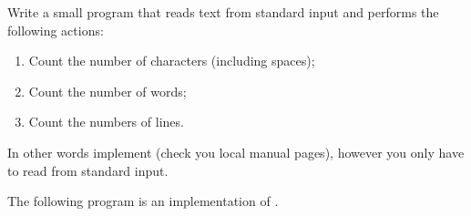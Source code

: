 \begin{Exercise}[title={Word and letter count},difficulty=5]
\label{ex:wc}
\Question\label{ex:wc q1} Write a small program that reads text from
standard input and performs the following actions:
\begin{enumerate}
\item{Count the number of characters (including spaces);}
\item{Count the number of words;}
\item{Count the numbers of lines.}
\end{enumerate}
In other words implement  (check you local manual pages),
however you only have to read from standard input.
\end{Exercise}

\begin{Answer}
\Question The following program is an implementation of .

\end{Answer}
